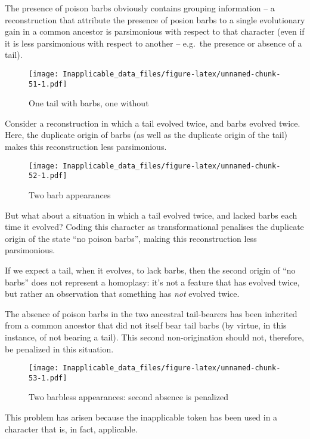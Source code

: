 \documentclass[]{book}
\theoremstyle{definition}
\theoremstyle{definition}
\theoremstyle{definition}
\theoremstyle{remark}
\begin{document}
The presence of poison barbs obviously contains grouping information --
a reconstruction that attribute the presence of posion barbs to a single
evolutionary gain in a common ancestor is parsimonious with respect to
that character (even if it is less parsimonious with respect to another
-- e.g.~the presence or absence of a tail).

\begin{figure}
\centering
\texttt{[image: Inapplicable\_data\_files/figure-latex/unnamed-chunk-51-1.pdf]}
\caption{\label{fig:unnamed-chunk-51}One tail with barbs, one without}
\end{figure}

Consider a reconstruction in which a tail evolved twice, and barbs
evolved twice. Here, the duplicate origin of barbs (as well as the
duplicate origin of the tail) makes this reconstruction less
parsimonious.

\begin{figure}
\centering
\texttt{[image: Inapplicable\_data\_files/figure-latex/unnamed-chunk-52-1.pdf]}
\caption{\label{fig:unnamed-chunk-52}Two barb appearances}
\end{figure}

But what about a situation in which a tail evolved twice, and lacked
barbs each time it evolved? Coding this character as transformational
penalises the duplicate origin of the state ``no poison barbs'', making
this reconstruction less parsimonious.

If we expect a tail, when it evolves, to lack barbs, then the second
origin of ``no barbs'' does not represent a homoplasy: it's not a
feature that has evolved twice, but rather an observation that something
has \emph{not} evolved twice.

The absence of poison barbs in the two ancestral tail-bearers has been
inherited from a common ancestor that did not itself bear tail barbs (by
virtue, in this instance, of not bearing a tail). This second
non-origination should not, therefore, be penalized in this situation.

\begin{figure}
\centering
\texttt{[image: Inapplicable\_data\_files/figure-latex/unnamed-chunk-53-1.pdf]}
\caption{\label{fig:unnamed-chunk-53}Two barbless appearances: second
absence is penalized}
\end{figure}

This problem has arisen because the inapplicable token has been used in
a character that is, in fact, applicable.
\end{document}
